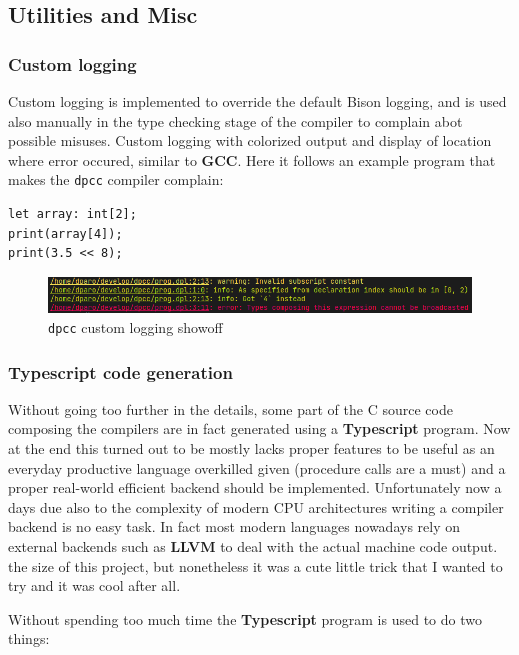 \documentclass[a4paper]{article}
\begin{document}
\subsection{Utilities and Misc}
\subsubsection{Custom logging}
Custom logging is implemented to override the default Bison logging, and is used also manually in the type checking
stage of the compiler to complain abot possible misuses.
Custom logging with colorized output and display of location where error occured, similar to \textbf{GCC}. Here it follows an example program that makes the \texttt{dpcc} compiler complain:
\begin{lstlisting}[language=DPL]
let array: int[2];
print(array[4]);
print(3.5 << 8);
\end{lstlisting}
    \begin{figure}[H]
        \centering
        \includegraphics[width=\linewidth]{imgs/log.png}
        \caption{\texttt{dpcc} custom logging showoff}
    \end{figure}


\subsubsection{Typescript code generation}

Without going too further in the details, some part of the C source code composing the compilers are in fact
generated using a \textbf{Typescript} program. Now at the end this turned out to be mostly lacks proper features to be useful as an everyday productive language overkilled given (procedure calls are a must)
and a proper real-world efficient backend should be implemented. Unfortunately now a days due also to the complexity
of modern CPU architectures writing a compiler backend is no easy task. In fact most modern languages
nowadays rely on external backends such as \textbf{LLVM} to deal with the actual machine code output.
the size of this project, but nonetheless it was a cute little trick that I wanted to try and it was cool
after all.

Without spending too much time the \textbf{Typescript} program is used to do two things:
\end{document}
